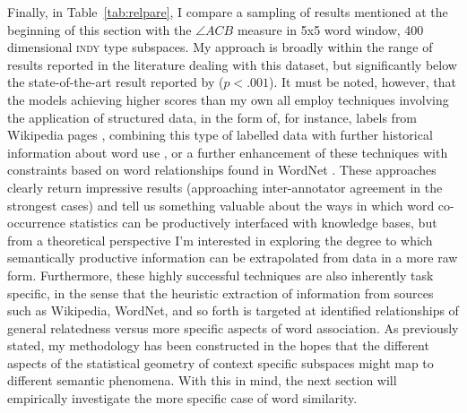 Finally, in Table~\ref{tab:relpare}, I compare a sampling of results mentioned at the beginning of this section with the $\angle ACB$ measure in 5x5 word window, 400 dimensional \textsc{indy} type subspaces.  My approach is broadly within the range of results reported in the literature dealing with this dataset, but significantly below the state-of-the-art result reported by \cite{HalawieEA2012} ($p < .001$).  It must be noted, however, that the models achieving higher scores than my own all employ techniques involving the application of structured data, in the form of, for instance, labels from Wikipedia pages \citep{GabrilovichEA2007}, combining this type of labelled data with further historical information about word use \citep{RadinskyEA2011}, or a further enhancement of these techniques with constraints based on word relationships found in WordNet \citep{HalawieEA2012}.  These approaches clearly return impressive results (approaching inter-annotator agreement in the strongest cases) and tell us something valuable about the ways in which word co-occurrence statistics can be productively interfaced with knowledge bases, but from a theoretical perspective I'm interested in exploring the degree to which semantically productive information can be extrapolated from data in a more raw form.  Furthermore, these highly successful techniques are also inherently task specific, in the sense that the heuristic extraction of information from sources such as Wikipedia, WordNet, and so forth is targeted at identified relationships of general relatedness versus more specific aspects of word association.  As previously stated, my methodology has been constructed in the hopes that the different aspects of the statistical geometry of context specific subspaces might map to different semantic phenomena.  With this in mind, the next section will empirically investigate the more specific case of word similarity.


